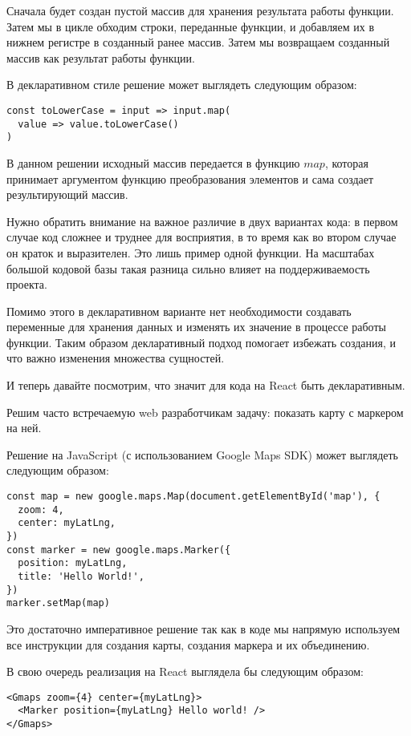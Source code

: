 Сначала будет создан пустой массив для хранения результата работы функции. Затем мы в цикле обходим строки, переданные функции, и добавляем их в нижнем регистре в созданный ранее массив. Затем мы возвращаем созданный массив как результат работы функции.

В декларативном стиле решение может выглядеть следующим образом:

\begin{lstlisting}
const toLowerCase = input => input.map(
  value => value.toLowerCase()
)
\end{lstlisting}

В данном решении исходный массив передается в функцию $map$, которая принимает аргументом функцию преобразования элементов и сама создает результирующий массив.

Нужно обратить внимание на важное различие в двух вариантах кода: в первом случае код сложнее и труднее для восприятия, в то время как во втором случае он краток и выразителен. Это лишь пример одной функции. На масштабах большой кодовой базы такая разница сильно влияет на поддерживаемость проекта.

Помимо этого в декларативном варианте нет необходимости создавать переменные для хранения данных и изменять их значение в процессе работы функции. Таким образом декларативный подход помогает избежать создания, и что важно изменения множества сущностей.

И теперь давайте посмотрим, что значит для кода на React быть декларативным.

Решим часто встречаемую web разработчикам задачу: показать карту с маркером на ней.

Решение на JavaScript (с использованием Google Maps SDK) может выглядеть следующим образом:

\begin{lstlisting}
const map = new google.maps.Map(document.getElementById('map'), {
  zoom: 4,
  center: myLatLng,
})
const marker = new google.maps.Marker({
  position: myLatLng,
  title: 'Hello World!',
})
marker.setMap(map)
\end{lstlisting}

Это достаточно императивное решение так как в коде мы напрямую используем все инструкции для создания карты, создания маркера и их объединению.

В свою очередь реализация на React выглядела бы следующим образом:

\begin{lstlisting}
<Gmaps zoom={4} center={myLatLng}>
  <Marker position={myLatLng} Hello world! />
</Gmaps> 
\end{lstlisting}

